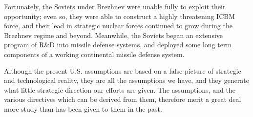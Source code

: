 Fortunately, the Soviets under Brezhnev were unable fully to exploit their opportunity; even so, they were able to construct a highly threatening ICBM force, and their lead in strategic nuclear forces continued to grow during the Brezhnev regime and beyond. Meanwhile, the Soviets began an extensive program of R\&D into missile defense systems, and deployed some long term components of a working continental missile defense system.

Although the present U.S. assumptions are based on a false picture of strategic and technological reality, they are all the assumptions we have, and they generate what little strategic direction our efforts are given. The assumptions, and the various directives which can be derived from them, therefore merit a great deal more study than has been given to them in the past.

\medskip

